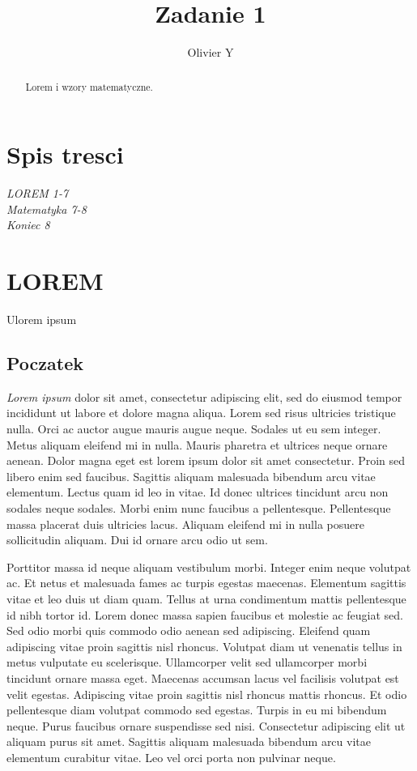 \documentclass[]{article}
\title{Zadanie 1}
\author{Olivier Y}
\begin{document}
\maketitle

\begin{abstract}
  \huge Lorem i wzory matematyczne.
\end{abstract}
\section{Spis tresci}
\emph{LOREM 1-7}\\
\emph{Matematyka 7-8}\\
\emph{Koniec 8}\\
\section{LOREM}
Ulorem ipsum
\subsection{Poczatek}
\emph{Lorem ipsum} dolor sit amet, consectetur adipiscing elit, sed do eiusmod tempor incididunt ut labore et dolore magna aliqua. Lorem sed risus ultricies tristique nulla. Orci ac auctor augue mauris augue neque. Sodales ut eu sem integer. Metus aliquam eleifend mi in nulla. Mauris pharetra et ultrices neque ornare aenean. Dolor magna eget est lorem ipsum dolor sit amet consectetur. Proin sed libero enim sed faucibus. Sagittis aliquam malesuada bibendum arcu vitae elementum. Lectus quam id leo in vitae. Id donec ultrices tincidunt arcu non sodales neque sodales. Morbi enim nunc faucibus a pellentesque. Pellentesque massa placerat duis ultricies lacus. Aliquam eleifend mi in nulla posuere sollicitudin aliquam. Dui id ornare arcu odio ut sem.

Porttitor massa id neque aliquam vestibulum morbi. Integer enim neque volutpat ac. Et netus et malesuada fames ac turpis egestas maecenas. Elementum sagittis vitae et leo duis ut diam quam. Tellus at urna condimentum mattis pellentesque id nibh tortor id. Lorem donec massa sapien faucibus et molestie ac feugiat sed. Sed odio morbi quis commodo odio aenean sed adipiscing. Eleifend quam adipiscing vitae proin sagittis nisl rhoncus. Volutpat diam ut venenatis tellus in metus vulputate eu scelerisque. Ullamcorper velit sed ullamcorper morbi tincidunt ornare massa eget. Maecenas accumsan lacus vel facilisis volutpat est velit egestas. Adipiscing vitae proin sagittis nisl rhoncus mattis rhoncus. Et odio pellentesque diam volutpat commodo sed egestas. Turpis in eu mi bibendum neque. Purus faucibus ornare suspendisse sed nisi. Consectetur adipiscing elit ut aliquam purus sit amet. Sagittis aliquam malesuada bibendum arcu vitae elementum curabitur vitae. Leo vel orci porta non pulvinar neque.
\end{document}
